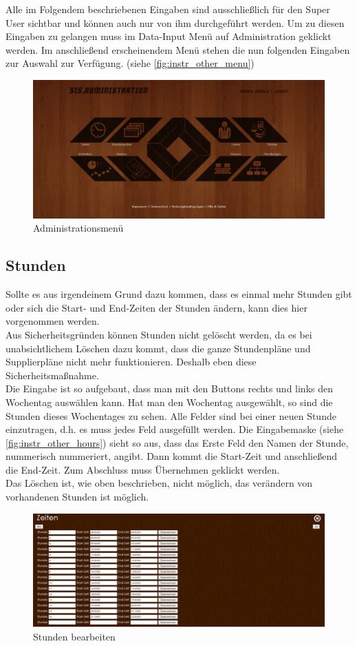 Alle im Folgendem beschriebenen Eingaben sind ausschließlich für den Super User sichtbar und können auch nur von ihm durchgeführt werden. Um zu diesen Eingaben zu gelangen muss im Data-Input Menü auf Administration geklickt werden. Im anschließend erscheinendem Menü stehen die nun folgenden Eingaben zur Auswahl zur Verfügung. (siehe \autoref{fig:instr_other_menu})
\begin{figure}[H]
\centering
\includegraphics[keepaspectratio=true, width=17cm]{images/screenshots/admin_menu.png}
\caption{Administrationsmenü}
\label{fig:instr_other_menu}
\end{figure}
\subsection{Stunden}\label{sec:instr_other_hours}
Sollte es aus irgendeinem Grund dazu kommen, dass es einmal mehr Stunden gibt oder sich die Start- und End-Zeiten der Stunden ändern, kann dies hier vorgenommen werden.\\
Aus Sicherheitsgründen können Stunden nicht gelöscht werden, da es bei unabsichtlichem Löschen dazu kommt, dass die ganze Stundenpläne und Supplierpläne nicht mehr funktionieren. Deshalb eben diese Sicherheitsmaßnahme.\\
Die Eingabe ist so aufgebaut, dass man mit den Buttons rechts und links den Wochentag auswählen kann. Hat man den Wochentag ausgewählt, so sind die Stunden dieses Wochentages zu sehen. Alle Felder sind bei einer neuen Stunde einzutragen, d.h. es muss jedes Feld ausgefüllt werden. Die Eingabemaske (siehe \autoref{fig:instr_other_hours}) sieht so aus, dass das Erste Feld den Namen der Stunde, nummerisch nummeriert, angibt. Dann kommt die Start-Zeit und anschließend die End-Zeit. Zum Abschluss muss Übernehmen geklickt werden.\\
Das Löschen ist, wie oben beschrieben, nicht möglich, das verändern von vorhandenen Stunden ist möglich. 
\begin{figure}[H]
\centering
\includegraphics[keepaspectratio=true, width=17cm]{images/screenshots/hours_input.png}
\caption{Stunden bearbeiten}
\label{fig:instr_other_hours}
\end{figure}
